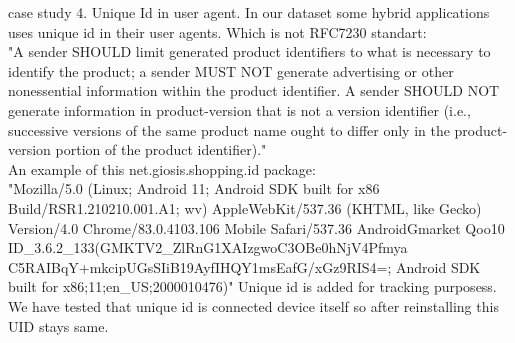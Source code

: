 case study 4. Unique Id in user agent.
In our dataset some hybrid applications uses unique id in their user agents. Which is not  RFC7230 standart:\\

"A sender SHOULD limit generated product identifiers to what is
   necessary to identify the product; a sender MUST NOT generate
   advertising or other nonessential information within the product
   identifier.  A sender SHOULD NOT generate information in
   product-version that is not a version identifier (i.e., successive versions of the same product name ought to differ only in the product-version portion of the product identifier)." \\
   
   
An example of this net.giosis.shopping.id package:
\\
\Centering
 "Mozilla/5.0 (Linux; Android 11; Android SDK built for x86 Build/RSR1.210210.001.A1; wv) AppleWebKit/537.36 (KHTML, like Gecko) Version/4.0 Chrome/83.0.4103.106 Mobile Safari/537.36 AndroidGmarket Qoo10 ID\_3.6.2\_133(GMKTV2\_ZlRnG1XAIzgwoC3OBe0hNjV4Pfmya
 C5RAIBqY+mkcipUGsSIiB19AyfIHQY1msEafG/xGz9RIS4=;
 Android SDK built for x86;11;en\_US;2000010476)"
Unique id is added for tracking purposess. We have tested that unique id is connected device itself so after reinstalling this UID stays same. 




